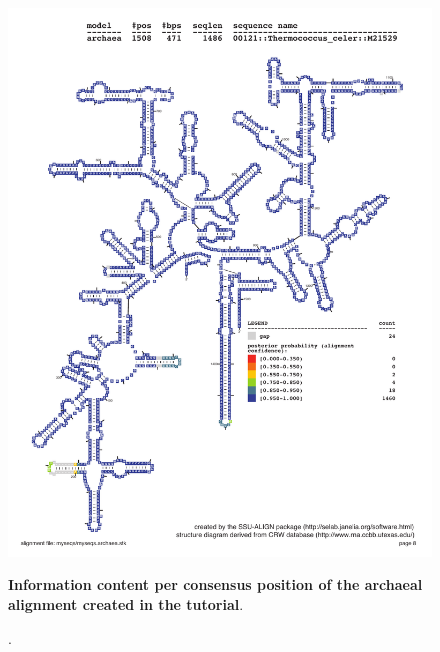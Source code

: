 \begin{figure}
  \begin{center}
\includegraphics[width=6.5in]{Figures/myseqs-archaea-indi-2}
\caption[Information content per consensus position of the
  archaeal alignment created in the tutorial]. \textbf{Information content per consensus position of the
  archaeal alignment created in the tutorial}.
  \end{center}
\label{fig:myseqs-archaea-indi-2}
\end{figure}
